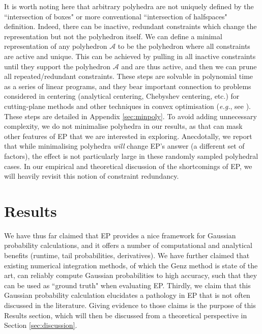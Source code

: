 \documentclass[twoside,11pt]{article}
\def\regionA{\mathcal{A}}
\begin{document}
It is worth noting here that arbitrary polyhedra are not uniquely defined by the ``intersection of boxes" or more conventional ``intersection of halfspaces" definition.  Indeed, there can be inactive, redundant constraints which change the representation but not the polyhedron itself.  We can define a minimal representation of any polyhedron $\regionA$ to be the polyhedron where all constraints are active and unique.  This can be achieved by pulling in all inactive constraints until they support the polyhedron $\regionA$ and are thus active, and then we can prune all repeated/redundant constraints.  These steps are solvable in polynomial time as a series of linear programs, and they bear important connection to problems considered in centering (analytical centering, Chebyshev centering, etc.) for cutting-plane methods and other techniques in convex optimisation ({\it e.g.}, see \cite{boydBook}).  These steps are detailed in Appendix \ref{sec:minpoly}.   To avoid adding unnecessary complexity, we do not minimalise polyhedra in our results, as that can mask other features of EP that we are interested in exploring.  Anecdotally, we report that while minimalising polyhedra \emph{will} change EP's answer (a different set of factors), the effect is not particularly large in these randomly sampled polyhedral cases.  In our empirical and theoretical discussion of the shortcomings of EP, we will heavily revisit this notion of constraint redundancy.


\section{Results}
\label{sec:results}

We have thus far claimed that EP provides a nice framework for Gaussian probability calculations, and it offers a number of computational and analytical benefits (runtime, tail probabilities, derivatives).   We have further claimed that existing numerical integration methods, of which the Genz method is state of the art, can reliably compute Gaussian probabilities to high accuracy, such that they can be used as ``ground truth" when evaluating EP.  Thirdly, we claim that this Gaussian probability calculation elucidates a pathology in EP that is not often discussed in the literature.  Giving evidence to those claims is the purpose of this Results section, which will then be discussed from a theoretical perspective in Section \ref{sec:discussion}.
\end{document}
